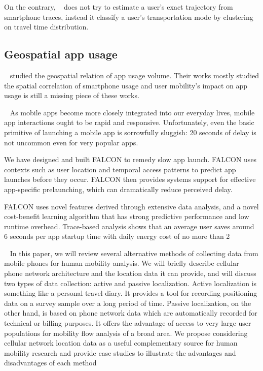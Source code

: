 On the contrary, ~\cite{wang2010transportation} does not try to estimate a user's exact trajectory from smartphone traces, instead it classify a user's transportation mode by clustering on travel time distribution. 

\subsection{Geospatial app usage}
~\cite{shafiq2012characterizing,yang2015characterizing} studied the geospatial relation of app usage volume. Their works mostly studied the spatial correlation of smartphone usage and user mobility's impact on app usage is still a missing piece of these works.

~\cite{yan2012fast}
As mobile apps become more closely integrated into our everyday lives, mobile app interactions ought to be rapid and responsive. Unfortunately, even the basic primitive of launching a mobile app is sorrowfully sluggish: 20 seconds of delay is not uncommon even for very popular apps.

We have designed and built FALCON to remedy slow app launch. FALCON uses contexts such as user location and temporal access patterns to predict app launches before they occur. FALCON then provides systems support for effective app-specific prelaunching, which can dramatically reduce perceived delay.

FALCON uses novel features derived through extensive data analysis, and a novel cost-benefit learning algorithm that has strong predictive performance and low runtime overhead. Trace-based analysis shows that an average user saves around 6 seconds per app startup time with daily energy cost of no more than 2%


~\cite{smoreda2013spatiotemporal}
In this paper, we will review several alternative methods of collecting data from mobile phones for human mobility analysis. We will briefly describe cellular phone network architecture and the location data it can provide, and will discuss two types of data collection: active and passive localization. Active localization is something like a personal travel diary. It provides a tool for recording positioning data on a survey sample over a long period of time. Passive localization, on the other hand, is based on phone network data which are automatically recorded for technical or billing purposes. It offers the advantage of access to very large user populations for mobility flow analysis of a broad area. We propose considering cellular network location data as a useful complementary source for human mobility research and provide case studies to illustrate the advantages and disadvantages of each method

